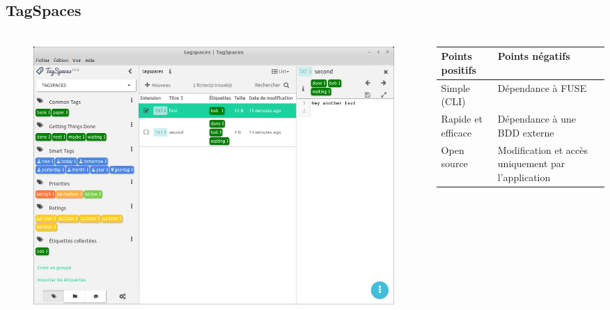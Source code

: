 \documentclass[10pt]{beamer}
\begin{document}
\subsection{TagSpaces}
\begin{frame}
    \frametitle{\subsecname}
    \begin{columns}[T]
        \begin{column}{.6\textwidth}
            \begin{figure}
                \includegraphics[width=1\textwidth]{images/tagspaces.png}
            \end{figure}
        \end{column}
        \pause
        \begin{column}{.4\textwidth}
        \fontsize{7pt}{9}\selectfont
            \begin{center}
                \begin{tabularx}{4.5cm}{|X|X|} \hline
                    \textbf{Points positifs} & \textbf{Points négatifs} \\ \hline
                    Simple (CLI) & Dépendance à FUSE \\ \hline
                    Rapide et efficace & Dépendance à une BDD externe \\ \hline
                    Open source & Modification et accès uniquement par l'application \\ \hline
                \end{tabularx}
            \end{center}
        \end{column}
    \end{columns}
\end{frame}
\end{document}

